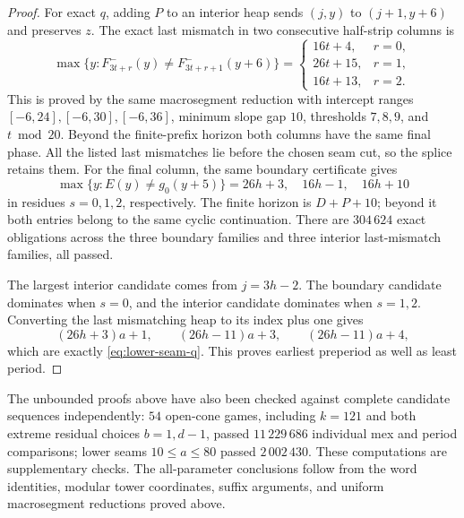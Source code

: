 \documentclass[11pt]{article}
\theoremstyle{remark}\newtheorem{remark}[theorem]{Remark}
\begin{document}
\begin{proof}
For exact $q$, adding $P$ to an interior heap sends
$(j,y)$ to $(j+1,y+6)$ and preserves $z$. The exact last mismatch in
two consecutive half-strip columns is
\begin{equation}\label{eq:lower-interior-last}
\max\{y:F^-_{3t+r}(y)\ne F^-_{3t+r+1}(y+6)\}
=\begin{cases}
16t+4,&r=0,\\26t+15,&r=1,\\16t+13,&r=2.
\end{cases}
\end{equation}
This is proved by the same macrosegment reduction with intercept ranges
$[-6,24],[-6,30],[-6,36]$, minimum slope gap $10$, thresholds $7,8,9$,
and $t\bmod20$. Beyond the finite-prefix horizon both columns have
the same final phase. All the listed last mismatches lie before the
chosen seam cut, so the splice retains them.
For the final column, the same boundary certificate gives
\[
 \max\{y:E(y)\ne g_0(y+5)\}
 =26h+3,\quad16h-1,\quad16h+10
\]
in residues $s=0,1,2$, respectively. The finite horizon is $D+P+10$;
beyond it both entries belong to the same cyclic continuation.
There are $304\,624$ exact obligations across the three boundary
families and three interior last-mismatch families, all passed.

The largest interior candidate comes from $j=3h-2$.
The boundary candidate dominates when $s=0$, and the interior candidate
dominates when $s=1,2$. Converting the last mismatching heap to its index
plus one gives
\[
 (26h+3)a+1,\qquad (26h-11)a+3,\qquad (26h-11)a+4,
\]
which are exactly \eqref{eq:lower-seam-q}. This proves earliest
preperiod as well as least period.
\end{proof}

The unbounded proofs above have also been checked against complete
candidate sequences independently: $54$ open-cone games, including
$k=121$ and both extreme residual choices $b=1,d-1$, passed
$11\,229\,686$ individual mex and period comparisons; lower seams
$10\le a\le80$ passed $2\,002\,430$. These computations are
supplementary checks. The all-parameter conclusions follow from the
word identities, modular tower coordinates, suffix arguments, and
uniform macrosegment reductions proved above.
\end{document}
